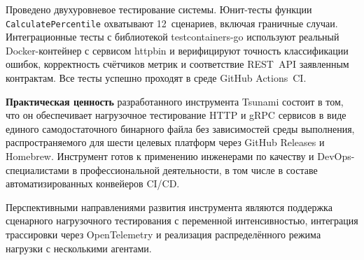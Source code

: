 Проведено двухуровневое тестирование системы.
Юнит-тесты функции \texttt{CalculatePercentile} охватывают 12~сценариев,
включая граничные случаи.
Интеграционные тесты с библиотекой testcontainers-go используют реальный
Docker-контейнер с сервисом httpbin и верифицируют точность классификации ошибок,
корректность счётчиков метрик и соответствие REST~API заявленным контрактам.
Все тесты успешно проходят в среде GitHub Actions~CI.

\textbf{Практическая ценность} разработанного инструмента Tsunami состоит в том,
что он обеспечивает нагрузочное тестирование HTTP и gRPC сервисов в виде
единого самодостаточного бинарного файла без зависимостей среды выполнения,
распространяемого для шести целевых платформ через GitHub Releases и Homebrew.
Инструмент готов к применению инженерами по качеству и DevOps-специалистами
в профессиональной деятельности, в том числе в составе автоматизированных
конвейеров CI/CD.

Перспективными направлениями развития инструмента являются поддержка сценарного
нагрузочного тестирования с переменной интенсивностью, интеграция трассировки
через OpenTelemetry и реализация распределённого режима нагрузки
с несколькими агентами.
